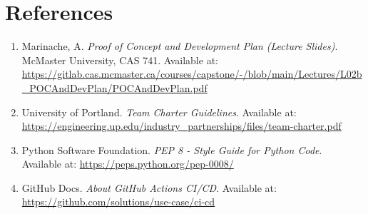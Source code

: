 \documentclass{article}
\begin{document}
\newpage{}

\section*{References}

\begin{enumerate}
  \item Marinache, A. \textit{Proof of Concept and Development Plan (Lecture Slides)}. McMaster University, CAS 741.  
  Available at: \url{https://gitlab.cas.mcmaster.ca/courses/capstone/-/blob/main/Lectures/L02b_POCAndDevPlan/POCAndDevPlan.pdf}

  \item University of Portland. \textit{Team Charter Guidelines}.  
  Available at: \url{https://engineering.up.edu/industry_partnerships/files/team-charter.pdf}

  \item Python Software Foundation. \textit{PEP 8 - Style Guide for Python Code}.  
  Available at: \url{https://peps.python.org/pep-0008/}

  \item GitHub Docs. \textit{About GitHub Actions CI/CD}.  
  Available at: \url{https://github.com/solutions/use-case/ci-cd}
\end{enumerate}
\end{document}
